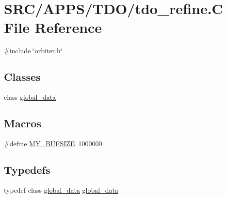 \hypertarget{tdo__refine_8_c}{}\section{S\+R\+C/\+A\+P\+P\+S/\+T\+D\+O/tdo\+\_\+refine.C File Reference}
\label{tdo__refine_8_c}
{\ttfamily \#include \char`\"{}orbiter.\+h\char`\"{}}\newline
\subsection*{Classes}
\begin{DoxyCompactItemize}
\item 
class \mbox{\hyperlink{classglobal__data}{global\+\_\+data}}
\end{DoxyCompactItemize}
\subsection*{Macros}
\begin{DoxyCompactItemize}
\item 
\#define \mbox{\hyperlink{tdo__refine_8_c_a6079b3b36c54787d2dca2de2fb2c96df}{M\+Y\+\_\+\+B\+U\+F\+S\+I\+ZE}}~1000000
\end{DoxyCompactItemize}
\subsection*{Typedefs}
\begin{DoxyCompactItemize}
\item 
typedef class \mbox{\hyperlink{classglobal__data}{global\+\_\+data}} \mbox{\hyperlink{tdo__refine_8_c_ac44e26e762dd25fb3f97f1ddcc34c093}{global\+\_\+data}}
\end{DoxyCompactItemize}
